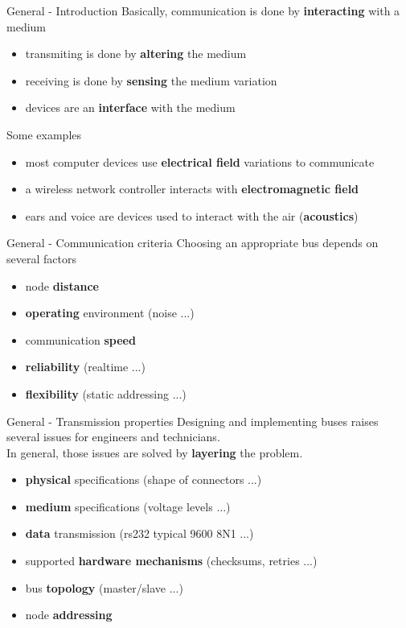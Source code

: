 \begin{frame}{General - Introduction}
  Basically, communication is done by \textbf{interacting} with a medium
  \begin{itemize}
  \item transmiting is done by \textbf{altering} the medium
  \item receiving is done by \textbf{sensing} the medium variation
  \item devices are an \textbf{interface} with the medium
  \end{itemize}

  \smallskip
  Some examples
  \begin{itemize}
  \item most computer devices use \textbf{electrical field} variations to communicate
  \item a wireless network controller interacts with \textbf{electromagnetic field}
  \item ears and voice are devices used to interact with the air (\textbf{acoustics})
  \end{itemize}

\end{frame}

\begin{frame}{General - Communication criteria}
  Choosing an appropriate bus depends on several factors
  \begin{itemize}
  \item node \textbf{distance}
  \item \textbf{operating} environment (noise ...)
  \item communication \textbf{speed}
  \item \textbf{reliability} (realtime ...)
  \item \textbf{flexibility} (static addressing ...)
  \end{itemize}
\end{frame}

\begin{frame}{General - Transmission properties}
  Designing and implementing buses raises several issues for engineers and technicians.\\
  In general, those issues are solved by \textbf{layering} the problem.\\
  \begin{itemize}
  \item \textbf{physical} specifications (shape of connectors ...)
  \item \textbf{medium} specifications (voltage levels ...)
  \item \textbf{data} transmission (rs232 typical 9600 8N1 ...)
  \item supported \textbf{hardware mechanisms} (checksums, retries ...)
  \item bus \textbf{topology} (master/slave ...)
  \item node \textbf{addressing}
  \end{itemize}
\end{frame}

